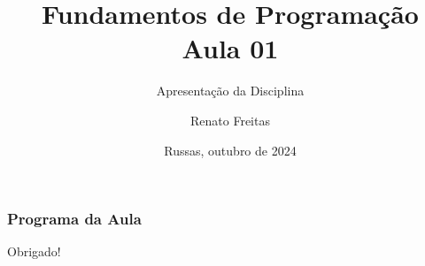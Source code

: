 \documentclass[11pt]{beamer}
\begin{document}
	\title{Fundamentos de Programação \\ Aula 01}
	\subtitle{Apresentação da Disciplina}
	\author{Renato Freitas}
	\date{Russas, outubro de 2024}
	\begin{frame}[plain]
		\maketitle
	\end{frame}
	
	
	\begin{frame}
		\frametitle{Programa da Aula}
		\tableofcontents
	\end{frame}






		
		
		
	




\begin{frame}[plain]
	\maketitle
	\centering
	Obrigado!
\end{frame}
\end{document}

